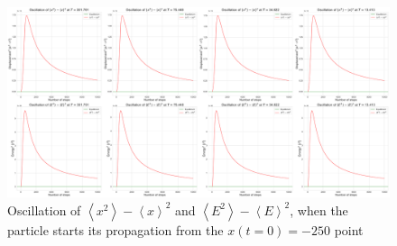 \begin{figure}
    \centering
    \includegraphics[width=\textwidth]{images/oscillation.pdf}
    \caption{Oscillation of $\left< x^{2} \right> - \left< x \right>^{2}$ and $\left< E^{2} \right> - \left< E \right>^{2}$, when the particle starts its propagation from the $x \left( t = 0 \right) = -250$ point}
    \label{fig:fig8}
\end{figure}